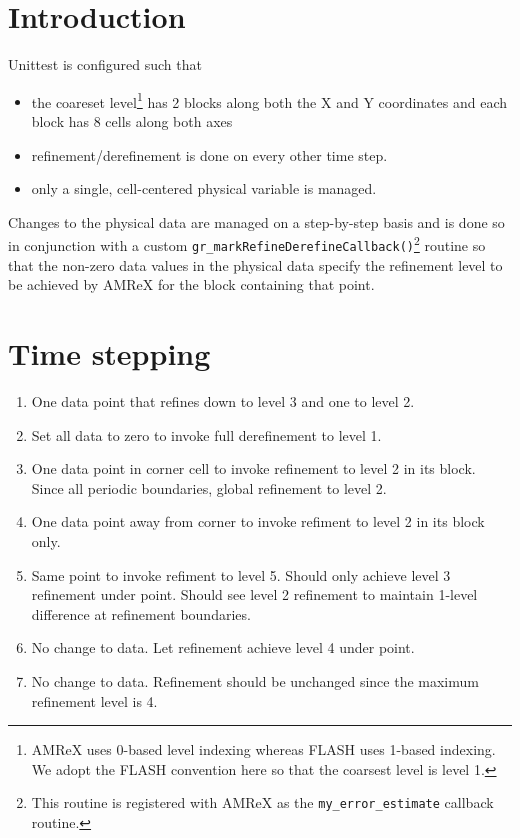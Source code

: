 \documentclass[12pt,letterpaper]{article}
\begin{document}
\setlength{\parindent}{0pt}

\section{Introduction}
Unittest is configured such that
\begin{itemize}
\item{the coareset level\footnote{AMReX uses 0-based level indexing whereas
FLASH uses 1-based indexing.  We adopt the FLASH convention here so that the coarsest
level is level 1.} has 2 blocks along both the X and Y
coordinates and each block has 8 cells along both axes}
\item{refinement/derefinement is done on every other time step.}
\item{only a single, cell-centered physical variable is managed.}
\end{itemize}

Changes to the physical data are managed on a step-by-step basis and is done so
in conjunction with a custom
\texttt{gr\_markRefineDerefineCallback()}\footnote{This routine is registered
with AMReX as the \texttt{my\_error\_estimate} callback routine.} routine so that the
non-zero data values in the physical data specify the refinement level to be
achieved by AMReX for the block containing that point.

\section{Time stepping}
\begin{enumerate}
\item[(Init)]{One data point that refines down to level 3 and one to level 2.}
\item[(Steps 1/2)]{Set all data to zero to invoke full derefinement to level 1.}
\item[(Steps 3/4)]{One data point in corner cell to invoke refinement to level 2 in
its block.  Since all periodic boundaries, global refinement to level 2.}
\item[(Steps 5/6)]{One data point away from corner to invoke refiment to level 2 in
its block only.}
\item[(Steps 7/8)]{Same point to invoke refiment to level 5.  Should only achieve
level 3 refinement under point.  Should see level 2
refinement to maintain 1-level difference at refinement boundaries.}
\item[(Steps 9/10)]{No change to data.  Let refinement achieve level 4 under
point.}
\item[(Steps 11/12)]{No change to data.  Refinement should be unchanged since
the maximum refinement level is 4.}
\end{enumerate}
\end{document}

